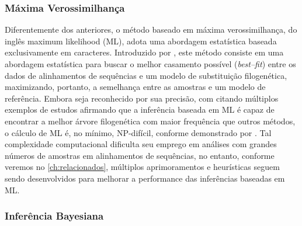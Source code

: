 \documentclass[english,brazilian]{UNISINOSmonografia} %
\begin{document}


\subsubsection{Máxima Verossimilhança}


Diferentemente dos anteriores, o método baseado em máxima verossimilhança, do inglês maximum likelihood (ML), adota uma abordagem estatística baseada exclusivamente em caracteres.
Introduzido por , este método consiste em uma abordagem estatística para buscar o melhor casamento possível (\textit{best--fit}) entre os dados de alinhamentos de sequências e um modelo de substituição filogenética, maximizando, portanto, a semelhança entre as amostras e um modelo de referência.
Embora seja reconhecido por sua precisão, com  citando múltiplos exemplos de estudos afirmando que a inferência baseada em ML é capaz de encontrar a melhor árvore filogenética com maior frequência que outros métodos, o cálculo de ML é, no mínimo, NP-difícil, conforme demonstrado por .
Tal complexidade computacional dificulta seu emprego em análises com grandes números de amostras em alinhamentos de sequências, no entanto, conforme veremos no \autoref{ch:relacionados}, múltiplos aprimoramentos e heurísticas seguem sendo desenvolvidos para melhorar a performance das inferências baseadas em ML.







\subsubsection{Inferência Bayesiana}
\end{document}
